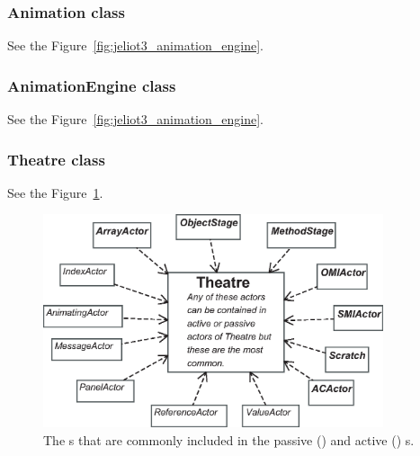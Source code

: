 \subsubsection{Animation class}

See the Figure~\ref{fig:jeliot3_animation_engine}.

\subsubsection{AnimationEngine class}

See the Figure~\ref{fig:jeliot3_animation_engine}.

\subsubsection{Theatre class}

See the Figure~\ref{fig:theatre_and_actorcontainers}.

\begin{figure}[!htb]
\begin{center}
\includegraphics[width=10cm]{images/theatre_and_actors.eps}
\caption{The s that are commonly included in the passive () and active () s.}
\label{fig:theatre_and_actorcontainers}
\end{center}
\end{figure}

